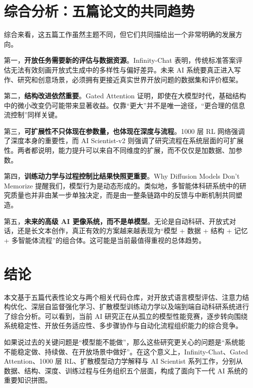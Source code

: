 \documentclass[UTF8,11pt]{ctexart}
\begin{document}
\section{综合分析：五篇论文的共同趋势}
综合来看，这五篇工作虽然主题不同，但它们共同描绘出一个非常明确的发展方向。

第一，\textbf{开放任务需要新的评估与数据资源}。Infinity-Chat 表明，传统标准答案评估无法有效刻画开放式生成中的多样性与偏好差异。未来 AI 系统要真正进入写作、研究和创意场景，必须拥有更接近真实世界开放问题的数据集和评价框架。

第二，\textbf{结构改进依然重要}。Gated Attention 证明，即使在大模型时代，基础结构中的微小改变仍可能带来显著收益。仅靠“更大”并不是唯一途径，“更合理的信息流控制”同样关键。

第三，\textbf{可扩展性不只体现在参数量，也体现在深度与流程}。1000 层 RL 网络强调了深度本身的重要性，而 AI Scientist-v2 则强调了研究流程在系统层面的可扩展性。两者都说明，能力提升可以来自不同维度的扩展，而不仅仅是加数据、加参数。

第四，\textbf{训练动力学与过程控制比结果快照更重要}。Why Diffusion Models Don't Memorize 提醒我们，模型行为是动态形成的。类似地，多智能体科研系统中的研究质量也并非由某一步单独决定，而是由一整条链路中的反馈与中断机制共同塑造。

第五，\textbf{未来的高级 AI 更像系统，而不是单模型}。无论是自动科研、开放式对话，还是长文本创作，真正有效的方案越来越表现为“模型 + 数据 + 结构 + 记忆 + 多智能体流程”的组合体。这可能是当前最值得重视的总体趋势。

\section{结论}
本文基于五篇代表性论文与两个相关代码仓库，对开放式语言模型评估、注意力结构优化、深层自监督强化学习、扩散模型训练动力学以及端到端自动科研系统进行了综合分析。可以看到，当前 AI 研究正在从孤立的模型性能竞赛，逐步转向围绕系统稳定性、开放任务适应性、多步骤协作与自动化流程组织能力的综合竞争。

如果说过去的关键问题是“模型能不能做”，那么这些研究更关心的问题是“系统能不能稳定做、持续做、在开放场景中做好”。在这个意义上，Infinity-Chat、Gated Attention、1000 层 RL、扩散模型动力学解释与 AI Scientist 系列工作，分别从数据、结构、深度、训练过程与任务组织五个层面，构成了面向下一代 AI 系统的重要知识拼图。
\end{document}
